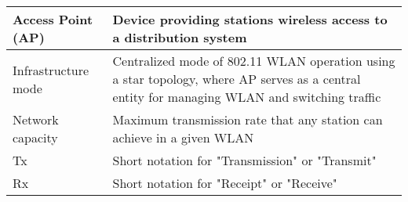 \begin{longtable}{|p{6cm}|p{10cm}|}
    \hline
    Access Point (AP) & Device providing stations wireless access to a distribution system \\
    \hline
    Infrastructure mode & Centralized mode of 802.11 WLAN operation using a star topology, where AP serves as a central entity for managing WLAN and switching traffic \\
    \hline
    Network capacity & Maximum transmission rate that any station can achieve in a given WLAN \\
    \hline
    Tx & Short notation for "Transmission" or "Transmit" \\
    \hline
    Rx & Short notation for "Receipt" or "Receive" \\
    \hline
\end{longtable}